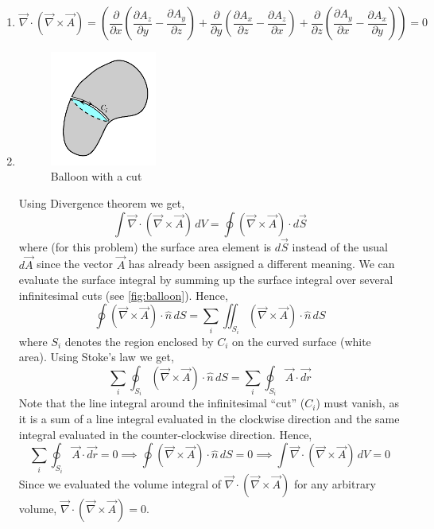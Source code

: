 \documentclass{esg8022pset}
\newcommand{\KKdiv}[6]{{#4}\left(\frac{\partial}{\partial x}{#1} {#5} \frac{\partial}{\partial y}{#2} {#6}\frac{\partial}{\partial z}{#3} \right)}
\begin{document}
\begin{solution}
  \begin{enumerate}
    \item $$\vec{\nabla}\cdot \left( \vec{\nabla} \times \vec{A} \right) = \KKdiv{\left( \frac{\partial A_z}{\partial y} - \frac{\partial A_y}{\partial z} \right)} {\left( \frac{\partial A_x}{\partial z} - \frac{\partial A_z}{\partial x} \right)} {\left( \frac{\partial A_y}{\partial x} - \frac{\partial A_x}{\partial y} \right)}{}{+}{+} = 0 $$
    \item 
      \begin{figure}[ht]
        \centering
        \includegraphics[width=0.33\textwidth]{ps03_sol_02}
        \caption{Balloon with a cut}
        \label{fig:balloon}
      \end{figure}
      Using Divergence theorem we get,
      $$\int \vec{\nabla}\cdot \left( \vec{\nabla} \times \vec{A} \right)\,dV = \oint \left( \vec{\nabla} \times \vec{A} \right)\cdot d\vec{S}$$
      where (for this problem) the surface area element is $d\vec{S}$ instead of the usual $d\vec{A}$ since the vector $\vec{A}$ has already been assigned a different meaning. We can evaluate the surface integral by summing up the surface integral over several infinitesimal cuts (see \autoref{fig:balloon}).
      Hence,
      $$\oint  \left( \vec{\nabla} \times \vec{A} \right)\cdot \hat{n}\,dS = \sum_i \iint_{S_i}\left( \vec{\nabla} \times \vec{A} \right)\cdot \hat{n}\,dS$$
      where $S_i$ denotes the region enclosed by $C_i$ on the curved surface (white area). Using Stoke's law we get,
      $$\sum_i \oint_{S_i}\left( \vec{\nabla} \times \vec{A} \right)\cdot \hat{n}\,dS = \sum_i \oint_{S_i} \vec{A}\cdot \vec{dr}$$
      Note that the line integral around the infinitesimal ``cut'' ($C_i$) must vanish, as it is a sum of a line integral evaluated in the clockwise direction and the same integral evaluated in the counter-clockwise direction. Hence,
      $$\sum_i \oint_{S_i} \vec{A}\cdot \vec{dr} = 0 \implies  \oint  \left( \vec{\nabla} \times \vec{A} \right)\cdot \hat{n}\,dS = 0 \implies \int \vec{\nabla}\cdot \left( \vec{\nabla} \times \vec{A} \right)\,dV = 0$$
      Since we evaluated the volume integral of $\vec{\nabla}\cdot \left( \vec{\nabla} \times \vec{A} \right)$ for any arbitrary volume, $\vec{\nabla}\cdot \left( \vec{\nabla} \times \vec{A}\right) = 0$.
  \end{enumerate}
\end{solution}
\end{document}
